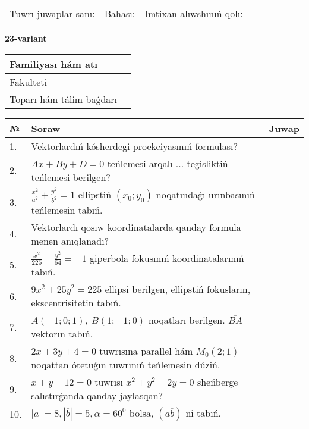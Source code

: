 \documentclass{article}
\begin{document}
\vspace{1cm}

\begin{tabular}{lll}
Tuwrı juwaplar sanı: \underline{\hspace{1.5cm}} & 
Bahası: \underline{\hspace{1.5cm}} & 
Imtixan alıwshınıń qolı: \underline{\hspace{2cm}} \\
\end{tabular}

\egroup

\newpage


\textbf{23-variant}\\

\bgroup
\def\arraystretch{1.6} %

\begin{tabular}{|m{5.7cm}|m{9.5cm}|}
\hline
Familiyası hám atı & \\
\hline
Fakulteti  & \\
\hline
Toparı hám tálim baǵdarı  & \\
\hline
\end{tabular}

\vspace{1cm}

\begin{tabular}{|m{0.7cm}|m{10cm}|m{4cm}|}
\hline
№ & Soraw & Juwap \\
\hline
1. & Vektorlardıń kósherdegi proekciyasınıń formulası? &  \\
\hline
2. & $Ax+By+D=0$ teńlemesi arqalı ... tegisliktiń teńlemesi berilgen? &  \\
\hline
3. & $\frac{x^2}{a^2}+\frac{y^2}{b^2}=1$ ellipstiń $(x_0;y_0)$ noqatındaǵı urınbasınıń teńlemesin tabıń. &  \\
\hline
4. & Vektorlardı qosıw koordinatalarda qanday formula menen anıqlanadı? &  \\
\hline
5. & $\frac{x^{2}}{225}-\frac{y^{2}}{64}=-1$ giperbola fokusınıń koordinatalarınıń tabıń. &  \\
\hline
6. & $9x^{2}+25y^{2}=225$ ellipsi berilgen, ellipstiń fokusların, ekscentrisitetin tabıń. &  \\
\hline
7. & $A (-1;0;1),\ B (1;-1;0)$ noqatları berilgen. $\overline{BA}$ vektorın tabıń. &  \\
\hline
8. & $2x+3y+4=0$ tuwrısına parallel hám $M_{0} (2;1)$ noqattan ótetuǵın tuwrınıń teńlemesin dúziń. &  \\
\hline
9. & $x+y-12=0$ tuwrısı $x^{2}+y^{2}-2y=0$ sheńberge salıstırǵanda qanday jaylasqan? &  \\
\hline
10. & $\left| \overline{a} \right|=8, \left| \overline{b} \right|=5, \alpha=60^{0}$ bolsa, $( \overline{a}\overline{b} )$ ni tabıń. &  \\
\hline
\end{tabular}
\end{document}
